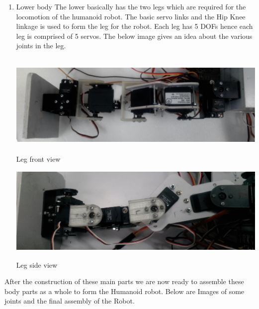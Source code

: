 \documentclass[12pt]{article}
\begin{document}
\begin{enumerate}
\item Lower body \newline
The lower basically has the two legs which are required for the locomotion of the
humanoid robot. The basic servo links and the Hip Knee linkage is used to form the
leg for the robot. Each leg has 5 DOFs hence each leg is comprised of 5 servos. The
below image gives an idea about the various joints in the leg.

\begin{center}
	\includegraphics[width = 13cm,height= 5cm]{leg_fv.jpg}\\{Leg front view} \\
	\vspace{1cm}
	\includegraphics[width = 13cm,height= 5cm]{leg_SV.jpg}\\{Leg side view}
\end{center}
\end{enumerate}
\newpage
After the construction of these main parts we are now ready to assemble these body
parts as a whole to form the Humanoid robot. Below are Images of some joints and
the final assembly of the Robot.
\end{document}
